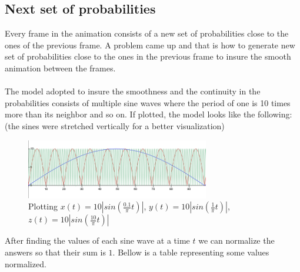 \documentclass[a4paper, 10pt]{article}
\begin{document}
        \subsection{Next set of probabilities}
        Every frame in the animation consists of a new set of probabilities close to the ones of the
        previous frame. A problem came up and that is how to generate new set of probabilities close
        to the ones in the previous frame to insure the smooth animation between the frames.\\\\
        The model adopted to insure the smoothness and the continuity in the probabilities consists
        of multiple sine waves where the period of one is 10 times more than its neighbor and so on.
        If plotted, the model looks like the following: (the sines were stretched vertically for a better
        visualization)
        \begin{figure}[hb]
            \centering
                \includegraphics[width=8cm]{graphics/sine_probabilities.png}
            \caption{Plotting
               $x(t) = 10\left| sin \left( \frac{0.1}{\pi}t \right) \right|$, 
               $y(t) = 10\left| sin \left( \frac{1}{\pi}t \right) \right|$, 
               $z(t) = 10\left| sin \left( \frac{10}{\pi}t \right) \right|$}
        \end{figure}
        After finding the values of each sine wave at a time $t$ we can normalize the answers so that
        their sum is $1$. Bellow is a table representing some values normalized.
\end{document}
